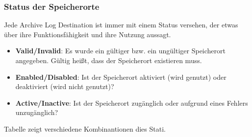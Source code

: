         \subsubsection{Status der Speicherorte}
          Jede Archive Log Destination ist immer mit einem Status versehen, der etwas über ihre Funktionsfähigkeit und ihre Nutzung aussagt.
        \begin{itemize}
          \item \textbf{Valid/Invalid}: Es wurde ein gültiger bzw. ein ungültiger Speicherort angegeben. Gültig heißt, dass der Speicherort existieren muss.
          \item \textbf{Enabled/Disabled}: Ist der Speicherort aktiviert (wird genutzt) oder deaktiviert (wird nicht genutzt)?
          \item \textbf{Active/Inactive}: Ist der Speicherort zugänglich oder aufgrund eines Fehlers unzugänglich?
        \end{itemize}
        Tabelle  zeigt verschiedene Kombinantionen
        dies Stati.
